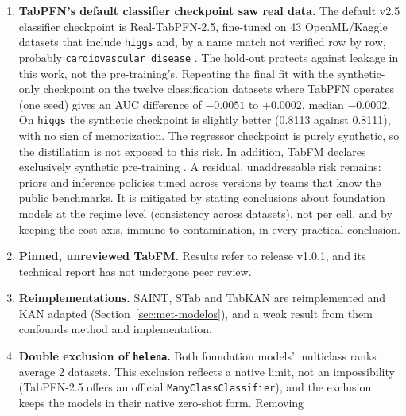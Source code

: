 \begin{enumerate}
    datasets $\times$ 3 seeds, inherited hyperparameters, a floor on
    the effect) finds RMSE improvement with standardization in 17 of
    the 25 cells, typically below 2\%. It is largest for the MLP
    ($+9.6\%$ on \texttt{kin8nm}, $+5.3\%$ on
    \texttt{year\_\allowbreak prediction}) and TabM ($+3.4\%$ on
    \texttt{year\_\allowbreak prediction}), with small degradations
    elsewhere (maximum $-4.3\%$). The deep regression baselines are
    slightly underestimated in those cases.
  \item \textbf{TabPFN's default classifier checkpoint saw real
    data.} The default v2.5 classifier checkpoint is Real-TabPFN-2.5,
    fine-tuned on 43 OpenML/Kaggle datasets that include
    \texttt{higgs} and, by a name match not verified row by row,
    probably \texttt{cardiovascular\_disease}
    \citep{priorlabs2025}. The hold-out protects against leakage in
    this work, not the pre-training's. Repeating the final fit with
    the synthetic-only checkpoint on the twelve classification
    datasets where TabPFN operates (one seed) gives an AUC
    difference of $-0.0051$ to $+0.0002$, median $-0.0002$. On
    \texttt{higgs} the synthetic checkpoint is slightly better
    (0.8113 against 0.8111), with no sign of memorization. The
    regressor checkpoint is purely synthetic, so the distillation is
    not exposed to this risk. In addition, TabFM declares
    exclusively synthetic pre-training \citep{kong2026}. A residual,
    unaddressable risk remains: priors and inference policies tuned
    across versions by teams that know the public benchmarks. It is
    mitigated by stating conclusions about foundation models at the
    regime level (consistency across datasets), not per cell, and by
    keeping the cost axis, immune to contamination, in every
    practical conclusion.
  \item \textbf{Pinned, unreviewed TabFM.} Results refer to release
    v1.0.1, and its technical report \citep{kong2026} has not
    undergone peer review.
  \item \textbf{Reimplementations.} SAINT, STab and TabKAN are
    reimplemented and KAN adapted (Section~\ref{sec:met-modelos}),
    and a weak result from them confounds method and implementation.
  \item \textbf{Double exclusion of \texttt{helena}.} Both
    foundation models' multiclass ranks average 2 datasets. This exclusion reflects a native limit, not an impossibility (TabPFN-2.5 offers an
    official \texttt{ManyClassClassifier}), and the exclusion keeps
    the models in their native zero-shot form. Removing

\end{enumerate}
